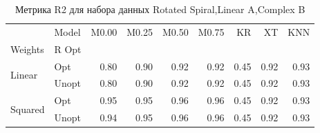 \begin{table}
\caption{Метрика R2 для набора данных Rotated Spiral,Linear A,Complex B}
\label{tab:R2_Rotated Spiral,Linear A,Complex B}
\begin{tabular}{llrrrrrrr}
\toprule
 & Model & M0.00 & M0.25 & M0.50 & M0.75 & KR & XT & KNN \\
Weights & R Opt &  &  &  &  &  &  &  \\
\midrule
\multirow[t]{2}{*}{Linear} & Opt & 0.80 & 0.90 & 0.92 & 0.92 & 0.45 & 0.92 & 0.93 \\
 & Unopt & 0.80 & 0.90 & 0.92 & 0.92 & 0.45 & 0.92 & 0.93 \\

\multirow[t]{2}{*}{Squared} & Opt & 0.95 & 0.95 & 0.96 & 0.96 & 0.45 & 0.92 & 0.93 \\
 & Unopt & 0.94 & 0.95 & 0.96 & 0.96 & 0.45 & 0.92 & 0.93 \\

\bottomrule
\end{tabular}
\end{table}
